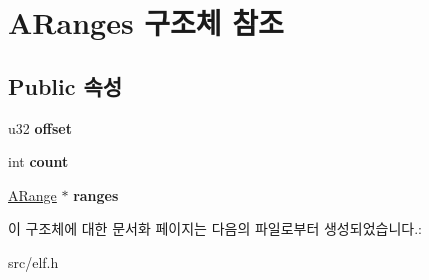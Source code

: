 \hypertarget{struct_a_ranges}{}\section{A\+Ranges 구조체 참조}
\label{struct_a_ranges}
\subsection*{Public 속성}
\begin{DoxyCompactItemize}
\item 
\mbox{\label{struct_a_ranges_ac9a8655acb6be1e8f52053fc49c34efa}} 
u32 {\bfseries offset}
\item 
\mbox{\label{struct_a_ranges_a6f197b7ddb2b3cb334c2eeb9de8d7288}} 
int {\bfseries count}
\item 
\mbox{\label{struct_a_ranges_a2eb62f0d43045767640b1d0c4dd8191e}} 
\mbox{\hyperlink{struct_a_range}{A\+Range}} $\ast$ {\bfseries ranges}
\end{DoxyCompactItemize}


이 구조체에 대한 문서화 페이지는 다음의 파일로부터 생성되었습니다.\+:\begin{DoxyCompactItemize}
\item 
src/elf.\+h\end{DoxyCompactItemize}
